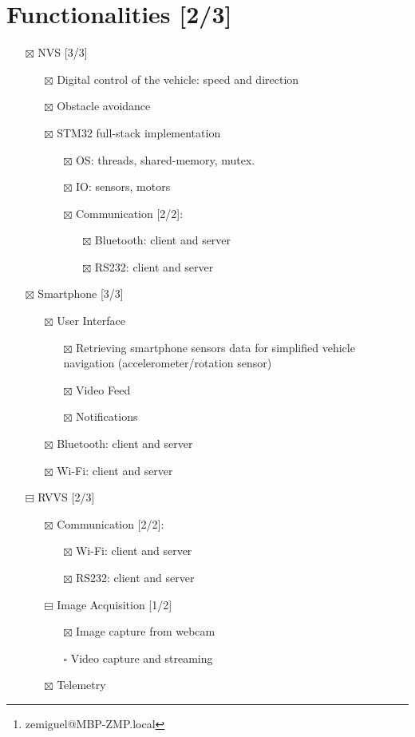 \documentclass[11pt]{article}
\author{José Miguel Alves Pires\thanks{zemiguel@MBP-ZMP.local}}
\date{\today}
\title{}
\begin{document}
\tableofcontents

\section{Functionalities [2/3]}
\label{sec:org11d6bdb}
\begin{itemize}
\item[{$\boxtimes$}] NVS [3/3]
\begin{itemize}
\item[{$\boxtimes$}] Digital control of the vehicle: speed and direction
\item[{$\boxtimes$}] Obstacle avoidance
\item[{$\boxtimes$}] STM32 full-stack implementation
\begin{itemize}
\item[{$\boxtimes$}] OS: threads, shared-memory, mutex.
\item[{$\boxtimes$}] IO: sensors, motors
\item[{$\boxtimes$}] Communication [2/2]:
\begin{itemize}
\item[{$\boxtimes$}] Bluetooth: client and server
\item[{$\boxtimes$}] RS232: client and server
\end{itemize}
\end{itemize}
\end{itemize}
\item[{$\boxtimes$}] Smartphone [3/3]
\begin{itemize}
\item[{$\boxtimes$}] User Interface
\begin{itemize}
\item[{$\boxtimes$}] Retrieving smartphone sensors data for simplified vehicle
navigation (accelerometer/rotation sensor)
\item[{$\boxtimes$}] Video Feed
\item[{$\boxtimes$}] Notifications
\end{itemize}
\item[{$\boxtimes$}] Bluetooth: client and server
\item[{$\boxtimes$}] Wi-Fi: client and server
\end{itemize}
\item[{$\boxminus$}] RVVS [2/3]
\begin{itemize}
\item[{$\boxtimes$}] Communication [2/2]:
\begin{itemize}
\item[{$\boxtimes$}] Wi-Fi: client and server
\item[{$\boxtimes$}] RS232: client and server
\end{itemize}
\item[{$\boxminus$}] Image Acquisition [1/2]
\begin{itemize}
\item[{$\boxtimes$}] Image capture from webcam
\item[{$\square$}] Video capture and streaming
\end{itemize}
\item[{$\boxtimes$}] Telemetry
\end{itemize}
\end{itemize}
\end{document}
